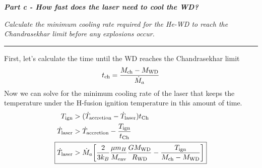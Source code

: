 \documentclass[12pt, letterpaper, twoside]{article}
\newcommand{\question}[1]{{\noindent \it #1}}
\newcommand{\answer}[1]{
    \par\noindent\rule{\textwidth}{0.4pt}#1\vspace{0.5cm}
}
\begin{document}
\question{\textbf{Part c - How fast does the laser need to cool the WD?}}

\question{Calculate the minimum cooling rate required for the He-WD to reach the Chandrasekhar limit before any explosions occur.}

\answer{
    First, let's calculate the time until the WD reaches the Chandrasekhar limit
    \begin{equation}
        t_{\rm ch} = \frac{M_{\rm ch} - M_{\rm WD}}{\dot{M}_a}
    \end{equation}
    Now we can solve for the minimum cooling rate of the laser that keeps the temperature under the H-fusion ignition temperature in this amount of time.
    \begin{align}
        T_{\rm ign} &> (\dot{T}_{\rm accretion} - \dot{T}_{\rm laser}) t_{\rm Ch} \\
        \dot{T}_{\rm laser} &> \dot{T}_{\rm accretion} - \frac{T_{\rm ign}}{t_{\rm Ch}} \\
        \Aboxed{ \dot{T}_{\rm laser}&> \dot{M}_a \qty[\frac{2}{3 k_B} \frac{\mu m_H}{M_{\rm env}} \frac{G M_{\rm WD}}{R_{\rm WD}} - \frac{T_{\rm ign}}{M_{\rm ch} - M_{\rm WD}}] }
    \end{align}
}
\end{document}
